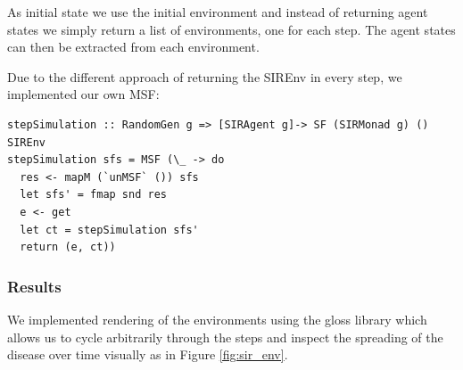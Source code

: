 As initial state we use the initial environment and instead of returning agent states we simply return a list of environments, one for each step. The agent states can then be extracted from each environment.

Due to the different approach of returning the SIREnv in every step, we implemented our own MSF:
\begin{verbatim}
stepSimulation :: RandomGen g => [SIRAgent g]-> SF (SIRMonad g) () SIREnv
stepSimulation sfs = MSF (\_ -> do
  res <- mapM (`unMSF` ()) sfs
  let sfs' = fmap snd res
  e <- get
  let ct = stepSimulation sfs'
  return (e, ct))
\end{verbatim}

\subsubsection{Results}
We implemented rendering of the environments using the gloss library which allows us to cycle arbitrarily through the steps and inspect the spreading of the disease over time visually as in Figure \ref{fig:sir_env}.

